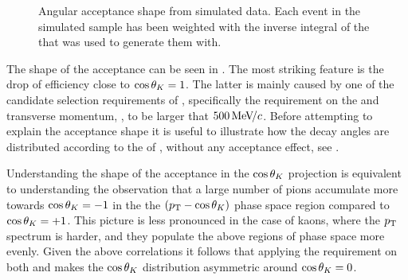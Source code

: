 \begin{figure}[h]
  \centering
  \begin{subfigure}{0.49\textwidth}
    \scalebox{1.15}{}
    \caption{}
    \label{angAcc_ctk}
  \end{subfigure}%
  \hfill%
  \begin{subfigure}{0.49\textwidth}
    \scalebox{1.15}{}
    \caption{}
    \label{angAcc_ctl}
  \end{subfigure}
  \vspace*{0.02\textwidth}
  \begin{subfigure}{0.49\textwidth}
    \scalebox{1.15}{}
    \caption{}
    \label{angAcc_phi}
  \end{subfigure}
  \caption{Angular acceptance shape from simulated data. Each event in the simulated sample has been weighted with the inverse integral
           of the \pdf that was used to generate them with.}
  \label{angAcc_all}
\end{figure}

The shape of the acceptance can be seen in . The most striking feature is the drop of efficiency
close to $\cos\theta_{K}=1$. The latter is mainly caused by one of the candidate selection requirements of ,
specifically the requirement on the \kaon and \pion transverse momentum, \pt, to be larger that $500{\mathrm{\,Me\kern -0.1em V\!/}c}$.
Before attempting to explain the acceptance shape it is useful to illustrate how the decay angles are
distributed according to the \pdf of , \ie without any acceptance effect, see .

Understanding the shape of the acceptance in the $\cos\theta_{K}$ projection is equivalent to understanding the observation
that a large number of pions accumulate more towards $\cos\theta_{K}=-1$ in the the $(\mbox{$p_{\rm T}$}-\cos\theta_{K})$ phase
space region compared to $\cos\theta_{K}=+1$. This picture is less pronounced in the case of kaons, where the $\mbox{$p_{\rm T}$}$ spectrum
is harder, and they populate the above regions of phase space more evenly. Given the above correlations it follows
that applying the \pt requirement on both \kaon and \pion makes the $\cos\theta_{K}$ distribution asymmetric around $\cos\theta_{K}=0$.

